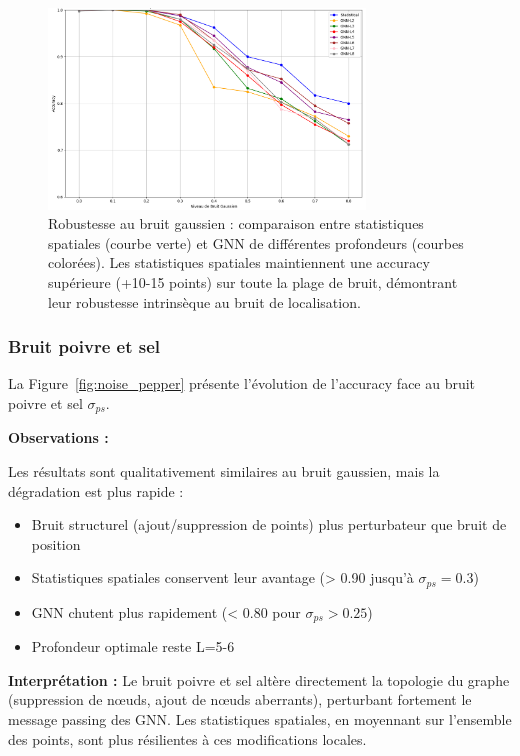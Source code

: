 \begin{figure}[htbp]
    \centering
    \includegraphics[width=0.75\textwidth]{../img/noise.png}
    \caption{Robustesse au bruit gaussien : comparaison entre statistiques spatiales (courbe verte) et GNN de différentes profondeurs (courbes colorées). Les statistiques spatiales maintiennent une accuracy supérieure (+10-15 points) sur toute la plage de bruit, démontrant leur robustesse intrinsèque au bruit de localisation.}
    \label{fig:noise_gaussian}
\end{figure}

\subsubsection{Bruit poivre et sel}

La Figure~\ref{fig:noise_pepper} présente l'évolution de l'accuracy face au bruit poivre et sel $\sigma_{ps}$.

\textbf{Observations :}

Les résultats sont qualitativement similaires au bruit gaussien, mais la dégradation est plus rapide :
\begin{itemize}
    \item Bruit structurel (ajout/suppression de points) plus perturbateur que bruit de position
    \item Statistiques spatiales conservent leur avantage (> 0.90 jusqu'à $\sigma_{ps}=0.3$)
    \item GNN chutent plus rapidement (< 0.80 pour $\sigma_{ps} > 0.25$)
    \item Profondeur optimale reste L=5-6
\end{itemize}

\textbf{Interprétation :} Le bruit poivre et sel altère directement la topologie du graphe (suppression de nœuds, ajout de nœuds aberrants), perturbant fortement le message passing des GNN. Les statistiques spatiales, en moyennant sur l'ensemble des points, sont plus résilientes à ces modifications locales.

